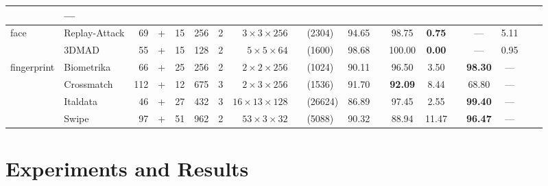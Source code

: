 \begin{table*}[htb]
\begin{center}
\begin{tabular}{llr@{}c@{}l@{ }c@{ }c@{ }r@{ }c@{}l@{ }ccc@{ }ccc@{ }c@{ }c@{}c}
                                                                                                                       & ---    & \cite{Sequeira:IJCB:2014} \\ %
\hline                                      
\multirow{2}{*}{face}
& Replay-Attack &  69&+&15 & 256 & 2 & $ 3\times  3\times 256$ &&  (2304) & 94.65 &&  98.75 &  \textbf{0.75} && ---    &   5.11 & \cite{Komulainen:ICB:2013} \\ %
& 3DMAD         &  55&+&15 & 128 & 2 & $ 5\times  5\times  64$ &&  (1600) & 98.68 && 100.00 &  \textbf{0.00}
                                                                                                    && ---    &   0.95 & \cite{Erdogmus:BIOSIG:2013}\\ 
\hline
\multirow{2}{*}{fingerprint}
& Biometrika    &  66&+&25 & 256 & 2 & $ 2\times  2\times 256$ &&  (1024) & 90.11 &&  96.50 &  3.50 &&  \textbf{98.30}
                                                                                                                       & ---    & \cite{Ghiani:ICB:2013} \\ %
& Crossmatch    & 112&+&12 & 675 & 3 & $ 2\times  3\times 256$ &&  (1536) & 91.70 && \textbf{92.09} 
                                                                                            &  8.44 &&  68.80 & ---    & \cite{Ghiani:ICB:2013} \\ %
& Italdata      &  46&+&27 & 432 & 3 & $16\times 13\times 128$ && (26624) & 86.89 &&  97.45 &  2.55 &&  \textbf{99.40}
                                                                                                                       & ---    & \cite{Ghiani:ICB:2013} \\ %
& Swipe         &  97&+&51 & 962 & 2 & $53\times  3\times  32$ &&  (5088) & 90.32 &&  88.94 & 11.47 &&  \textbf{96.47}
                                                                                                                       & ---    & \cite{Ghiani:ICB:2013} \\ %
\hline
\end{tabular}
\end{center}
\end{table*}

\section{Experiments and Results}
\label{sec:experiments}



